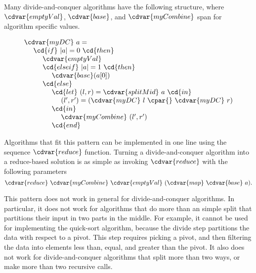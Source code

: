 \begin{cluster}
\label{grp:grm:design::dc::structure}

\begin{gram}
\label{grm:design::dc::structure}
Many divide-and-conquer algorithms have the following structure, where
$\cdvar{emptyVal}$, $\cdvar{base}$, and $\cdvar{myCombine}$ span for algorithm
specific values.

\[
\begin{array}{l}
\cdvar{myDC}~a =
\\ 
~~~~\cd{if}~|a| = 0 ~\cd{then}
\\
~~~~~~~~\cdvar{emptyVal}
\\
~~~~~~~~\cd{else if}~|a| = 1 ~\cd{then}
\\
~~~~~~~~~~~~\cdvar{base}(a[0])
\\
~~~~~~~~\cd{else}
\\
~~~~~~~~~~~~\cd{let}~(l,r) = \cdvar{splitMid}~a~\cd{in}
\\
~~~~~~~~~~~~~~~~(l',r') = (\cdvar{myDC}~l~\cpar{}~\cdvar{myDC}~r)
\\
~~~~~~~~~~~~\cd{in}
\\
~~~~~~~~~~~~~~~~\cdvar{myCombine}~(l', r')
\\
~~~~~~~~~~~~\cd{end}
\end{array}
\]

Algorithms that fit this pattern can be implemented in one line using
the sequence $\cdvar{reduce}$ function.
Turning a divide-and-conquer algorithm into a reduce-based solution is
as simple as invoking $\cdvar{reduce}$ with the following parameters
\[
\cdvar{reduce}~\cdvar{myCombine}~\cdvar{emptyVal}~(\cdvar{map}~\cdvar{base}~a).
\]

\end{gram}
\end{cluster}

\begin{cluster}
\label{grp:imp:design::dc::pattern}

\begin{important}
\label{imp:design::dc::pattern}
This pattern does not work in general for divide-and-conquer
algorithms.  In particular, it does not work for algorithms that do
more than an simple split that partitions their input in two parts in
the middle.  
For example, it cannot be used for implementing the quick-sort
algorithm, because the divide step partitions the data with respect to
a pivot.  
This step requires picking a pivot, and then filtering the
data into elements less than, equal, and greater than the pivot.  
It also does not work for divide-and-conquer algorithms that split
more than two ways, or make more than two recursive calls.

\end{important}
\end{cluster}

